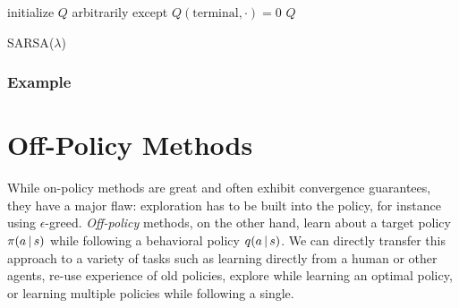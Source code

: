 				\begin{algorithm}  \DontPrintSemicolon
					initialize \(Q\) arbitrarily except \(Q(\mathrm{terminal}, \cdot) = 0\) \;
					\Return \(Q\) \;
					\caption{\acs{SARSA}(\(\lambda\))}
					\label{alg:sarsaLambda}
				\end{algorithm}

			\subsubsection{Example}

	\section{Off-Policy Methods}
		While on-policy methods are great and often exhibit convergence guarantees, they have a major flaw: exploration has to be built into the policy, for instance using \(\epsilon\)-greed. \emph{Off-policy} methods, on the other hand, learn about a target policy \(\pi(a \,\vert\, s)\) while following a behavioral policy \(q(a \,\vert\, s)\). We can directly transfer this approach to a variety of tasks such as learning directly from a human or other agents, re-use experience of old policies, explore while learning an optimal policy, or learning multiple policies while following a single.

